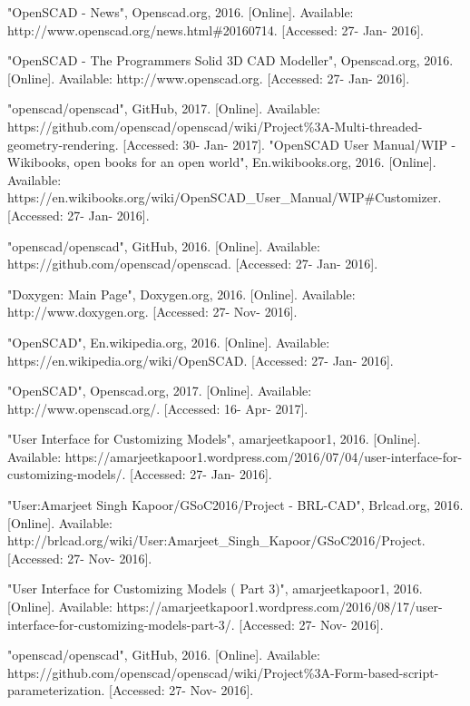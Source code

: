  
\begin{thebibliography}{22}


\bibitem{} "OpenSCAD - News", Openscad.org, 2016. [Online]. Available: http://www.openscad.org/news.html\#20160714. [Accessed: 27- Jan- 2016].

\bibitem{} "OpenSCAD - The Programmers Solid 3D CAD Modeller", Openscad.org, 2016. [Online]. Available: http://www.openscad.org. [Accessed: 27- Jan- 2016].

\bibitem{} "openscad/openscad", GitHub, 2017. [Online]. Available: https://github.com/openscad/openscad/wiki/Project\%3A-Multi-threaded-geometry-rendering. [Accessed: 30- Jan- 2017].
\bibitem{} "OpenSCAD User Manual/WIP - Wikibooks, open books for an open world", En.wikibooks.org, 2016. [Online]. Available: https://en.wikibooks.org/wiki/OpenSCAD\_User\_Manual/WIP\#Customizer. [Accessed: 27- Jan- 2016].

\bibitem{} "openscad/openscad", GitHub, 2016. [Online]. Available: https://github.com/openscad/openscad. [Accessed: 27- Jan- 2016].

\bibitem{} "Doxygen: Main Page", Doxygen.org, 2016. [Online]. Available: http://www.doxygen.org. [Accessed: 27- Nov- 2016].

\bibitem{} "OpenSCAD", En.wikipedia.org, 2016. [Online]. Available: https://en.wikipedia.org/wiki/OpenSCAD. [Accessed: 27- Jan- 2016].

\bibitem{} "OpenSCAD", Openscad.org, 2017. [Online]. Available: http://www.openscad.org/. [Accessed: 16- Apr- 2017].

\bibitem{} "User Interface for Customizing Models", amarjeetkapoor1, 2016. [Online]. Available: https://amarjeetkapoor1.wordpress.com/2016/07/04/user-interface-for-customizing-models/. [Accessed: 27- Jan- 2016].


\bibitem{} "User:Amarjeet Singh Kapoor/GSoC2016/Project - BRL-CAD", Brlcad.org, 2016. [Online]. Available: http://brlcad.org/wiki/User:Amarjeet\_Singh\_Kapoor/GSoC2016/Project. [Accessed: 27- Nov- 2016].

\bibitem{} "User Interface for Customizing Models ( Part 3)", amarjeetkapoor1, 2016. [Online]. Available: https://amarjeetkapoor1.wordpress.com/2016/08/17/user-interface-for-customizing-models-part-3/. [Accessed: 27- Nov- 2016].

\bibitem{} "openscad/openscad", GitHub, 2016. [Online]. Available: https://github.com/openscad/openscad/wiki/Project\%3A-Form-based-script-parameterization. [Accessed: 27- Nov- 2016].


\end{thebibliography}
